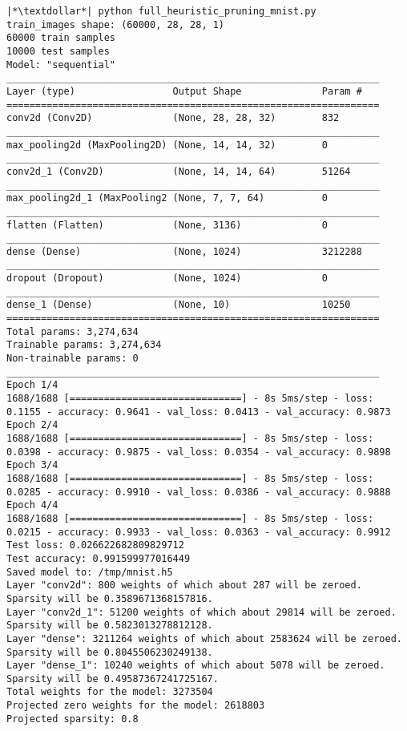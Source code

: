 \begin{lstlisting}[label={lst:mnistpipelineoutput},
    caption=MNIST pipeline output execution]
|*\textdollar*| python full_heuristic_pruning_mnist.py
train_images shape: (60000, 28, 28, 1)
60000 train samples
10000 test samples
Model: "sequential"
_________________________________________________________________
Layer (type)                 Output Shape              Param #
=================================================================
conv2d (Conv2D)              (None, 28, 28, 32)        832
_________________________________________________________________
max_pooling2d (MaxPooling2D) (None, 14, 14, 32)        0
_________________________________________________________________
conv2d_1 (Conv2D)            (None, 14, 14, 64)        51264
_________________________________________________________________
max_pooling2d_1 (MaxPooling2 (None, 7, 7, 64)          0
_________________________________________________________________
flatten (Flatten)            (None, 3136)              0
_________________________________________________________________
dense (Dense)                (None, 1024)              3212288
_________________________________________________________________
dropout (Dropout)            (None, 1024)              0
_________________________________________________________________
dense_1 (Dense)              (None, 10)                10250
=================================================================
Total params: 3,274,634
Trainable params: 3,274,634
Non-trainable params: 0
_________________________________________________________________
Epoch 1/4
1688/1688 [==============================] - 8s 5ms/step - loss: 0.1155 - accuracy: 0.9641 - val_loss: 0.0413 - val_accuracy: 0.9873
Epoch 2/4
1688/1688 [==============================] - 8s 5ms/step - loss: 0.0398 - accuracy: 0.9875 - val_loss: 0.0354 - val_accuracy: 0.9898
Epoch 3/4
1688/1688 [==============================] - 8s 5ms/step - loss: 0.0285 - accuracy: 0.9910 - val_loss: 0.0386 - val_accuracy: 0.9888
Epoch 4/4
1688/1688 [==============================] - 8s 5ms/step - loss: 0.0215 - accuracy: 0.9933 - val_loss: 0.0363 - val_accuracy: 0.9912
Test loss: 0.026622682809829712
Test accuracy: 0.991599977016449
Saved model to: /tmp/mnist.h5
Layer "conv2d": 800 weights of which about 287 will be zeroed. Sparsity will be 0.3589671368157816.
Layer "conv2d_1": 51200 weights of which about 29814 will be zeroed. Sparsity will be 0.5823013278812128.
Layer "dense": 3211264 weights of which about 2583624 will be zeroed. Sparsity will be 0.8045506230249138.
Layer "dense_1": 10240 weights of which about 5078 will be zeroed. Sparsity will be 0.49587367241725167.
Total weights for the model: 3273504
Projected zero weights for the model: 2618803
Projected sparsity: 0.8


\end{lstlisting}
